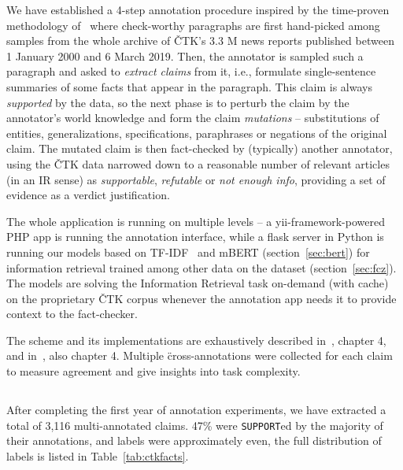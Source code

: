 We have established a 4-step annotation procedure inspired by the time-proven methodology of~\cite{fever} where check-worthy paragraphs are first hand-picked among samples from the whole archive of ČTK's 3.3 M news reports published between 1 January 2000 and 6 March 2019. Then, the annotator is sampled such a paragraph and asked to \textit{extract claims} from it, i.e., formulate single-sentence summaries of some facts that appear in the paragraph. This claim is always \textit{supported} by the data, so the next phase is to perturb the claim by the annotator's world knowledge and form the claim \textit{mutations} -- substitutions of entities, generalizations, specifications, paraphrases or negations of the original claim. 
The mutated claim is then fact-checked by (typically) another annotator, using the ČTK data narrowed down to a reasonable number of relevant articles (in an IR sense) as \textit{supportable}, \textit{refutable} or \textit{not enough info}, providing a set of evidence as a verdict justification.

The whole application is running on multiple levels -- a yii-framework-powered PHP app is running the annotation interface, while a flask server in Python is running our models based on TF-IDF~\cite{drqa} and mBERT (section~\ref{sec:bert}) for information retrieval trained among other data on the \FCZ dataset (section~\ref{sec:fcz}).
The models are solving the Information Retrieval task on-demand (with cache) on the proprietary ČTK corpus whenever the annotation app needs it to provide context to the fact-checker.

The scheme and its implementations are exhaustively described in~\cite{diplomka}, chapter 4, and in~\cite{lrev}, also chapter 4.
Multiple \"{cross-annotations} were collected for each claim to measure agreement and give insights into task complexity.

\subsection{\CTK}
\label{sec:ctkfacts}


After completing the first year of annotation experiments, we have extracted a total of 3,116 multi-annotated claims.
47\% were \texttt{SUPPORT}ed by the majority of their annotations, \REF{} and \NEI{} labels were approximately even, the full distribution of labels is listed in Table~\ref{tab:ctkfacts}.

